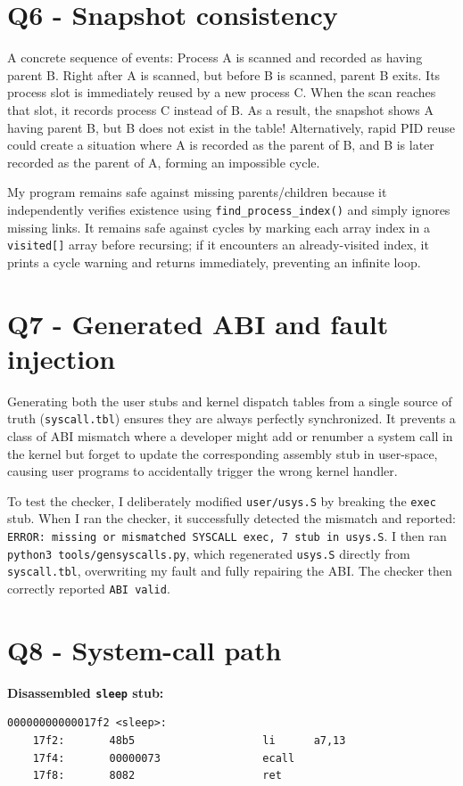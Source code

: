 \documentclass[11pt,a4paper]{article}
\begin{document}
\section*{Q6 - Snapshot consistency}
A concrete sequence of events: Process A is scanned and recorded as having parent B. Right after A is scanned, but before B is scanned, parent B exits. Its process slot is immediately reused by a new process C. When the scan reaches that slot, it records process C instead of B. As a result, the snapshot shows A having parent B, but B does not exist in the table! Alternatively, rapid PID reuse could create a situation where A is recorded as the parent of B, and B is later recorded as the parent of A, forming an impossible cycle.

My program remains safe against missing parents/children because it independently verifies existence using \texttt{find\_process\_index()} and simply ignores missing links. It remains safe against cycles by marking each array index in a \texttt{visited[]} array before recursing; if it encounters an already-visited index, it prints a cycle warning and returns immediately, preventing an infinite loop.

\section*{Q7 - Generated ABI and fault injection}
Generating both the user stubs and kernel dispatch tables from a single source of truth (\texttt{syscall.tbl}) ensures they are always perfectly synchronized. It prevents a class of ABI mismatch where a developer might add or renumber a system call in the kernel but forget to update the corresponding assembly stub in user-space, causing user programs to accidentally trigger the wrong kernel handler.

To test the checker, I deliberately modified \texttt{user/usys.S} by breaking the \texttt{exec} stub. When I ran the checker, it successfully detected the mismatch and reported: \texttt{ERROR: missing or mismatched SYSCALL exec, 7 stub in usys.S}. I then ran \texttt{python3 tools/gensyscalls.py}, which regenerated \texttt{usys.S} directly from \texttt{syscall.tbl}, overwriting my fault and fully repairing the ABI. The checker then correctly reported \texttt{ABI valid}.

\section*{Q8 - System-call path}
\textbf{Disassembled \texttt{sleep} stub:}
\begin{lstlisting}
00000000000017f2 <sleep>:
    17f2:       48b5                    li      a7,13
    17f4:       00000073                ecall
    17f8:       8082                    ret
\end{lstlisting}
\end{document}

